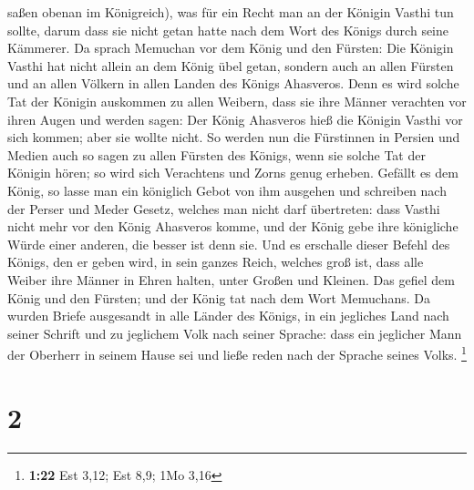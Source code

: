 saßen obenan im Königreich),  was für ein Recht man an
der Königin Vasthi tun sollte, darum dass sie nicht getan hatte nach dem
Wort des Königs durch seine Kämmerer.  Da sprach Memuchan
vor dem König und den Fürsten: Die Königin Vasthi hat nicht allein an
dem König übel getan, sondern auch an allen Fürsten und an allen Völkern
in allen Landen des Königs Ahasveros.  Denn es wird
solche Tat der Königin auskommen zu allen Weibern, dass sie ihre Männer
verachten vor ihren Augen und werden sagen: Der König Ahasveros hieß die
Königin Vasthi vor sich kommen; aber sie wollte nicht. 
So werden nun die Fürstinnen in Persien und Medien auch so sagen zu
allen Fürsten des Königs, wenn sie solche Tat der Königin hören; so wird
sich Verachtens und Zorns genug erheben.  Gefällt es dem
König, so lasse man ein königlich Gebot von ihm ausgehen und schreiben
nach der Perser und Meder Gesetz, welches man nicht darf übertreten:
dass Vasthi nicht mehr vor den König Ahasveros komme, und der König gebe
ihre königliche Würde einer anderen, die besser ist denn sie.
 Und es erschalle dieser Befehl des Königs, den er geben
wird, in sein ganzes Reich, welches groß ist, dass alle Weiber ihre
Männer in Ehren halten, unter Großen und Kleinen.  Das
gefiel dem König und den Fürsten; und der König tat nach dem Wort
Memuchans.  Da wurden Briefe ausgesandt in alle Länder
des Königs, in ein jegliches Land nach seiner Schrift und zu jeglichem
Volk nach seiner Sprache: dass ein jeglicher Mann der Oberherr in seinem
Hause sei und ließe reden nach der Sprache seines Volks. \footnote{\textbf{1:22}
  Est 3,12; Est 8,9; 1Mo 3,16}

\hypertarget{section-1}{%
\section{2}\label{section-1}}

